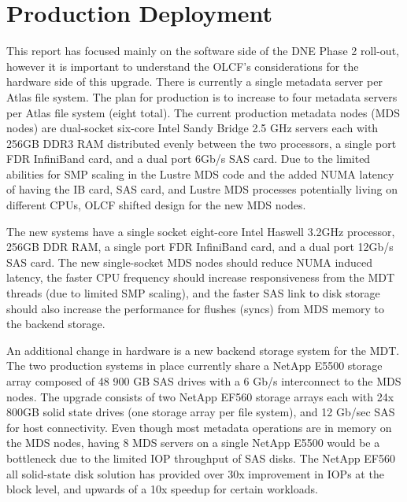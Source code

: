 \documentclass[conference,compsoc]{IEEEtran}
\begin{document}
\section{Production Deployment}

This report has focused mainly on the software side of the DNE Phase 2 roll-out,
however it is important to understand the OLCF's considerations for the
hardware side of this upgrade. There is currently a single metadata server per
Atlas file system. The plan for production is to increase to four metadata
servers per Atlas file system (eight total). The current production metadata
nodes (MDS nodes) are dual-socket six-core Intel Sandy Bridge 2.5 GHz servers
each with 256GB DDR3 RAM distributed evenly between the two processors, a
single port FDR InfiniBand card, and a dual port 6Gb/s SAS card. Due to the
limited abilities for SMP scaling in the Lustre MDS code and the added NUMA
latency of having the IB card, SAS card, and Lustre MDS processes potentially
living on different CPUs, OLCF shifted design for the new MDS nodes.

The new systems have a single socket eight-core Intel Haswell 3.2GHz
processor, 256GB DDR RAM, a single port FDR InfiniBand card, and a dual port
12Gb/s SAS card. The new single-socket MDS nodes should reduce NUMA induced
latency, the faster CPU frequency should increase responsiveness from the MDT
threads (due to limited SMP scaling), and the faster SAS link to disk storage
should also increase the performance for flushes (syncs) from MDS memory to the
backend storage.

An additional change in hardware is a new backend storage system for the MDT. The two
production systems in place currently share a NetApp E5500 storage array
composed of 48 900 GB SAS drives with a 6 Gb/s interconnect to the MDS nodes. The
upgrade consists of two NetApp EF560 storage arrays each with 24x
800GB solid state drives (one storage array per file system), and 12 Gb/sec SAS
for host connectivity. Even though most metadata operations are in
memory on the MDS nodes, having 8 MDS servers on a single NetApp
E5500 would be a bottleneck due to the limited IOP throughput of SAS disks. The
NetApp EF560 all solid-state disk solution has provided over 30x improvement in
IOPs at the block level, and upwards of a 10x speedup for certain workloads.
\end{document}
